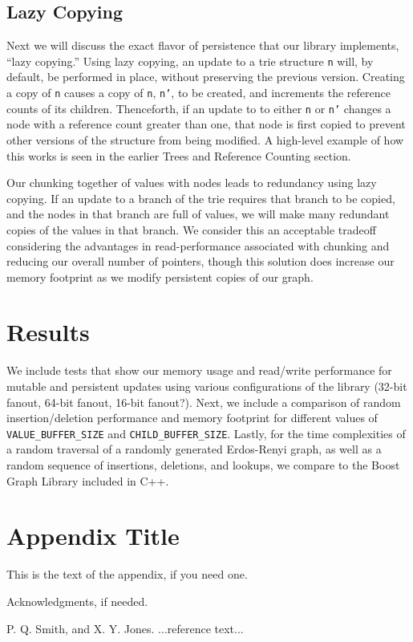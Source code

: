 \documentclass[preprint]{sigplanconf}
\begin{document}
\subsection{Lazy Copying}
Next we will discuss the exact flavor of persistence that our library implements, ``lazy copying.''
Using lazy copying, an update to a trie structure \texttt{n} will, by default, be performed in place, without preserving the previous version. 
Creating a copy of \texttt{n} causes a copy of \texttt{n}, \texttt{n'}, to be created, and increments the reference counts of its children.
Thenceforth, if an update to to either \texttt{n} or \texttt{n'} changes a node with a reference count greater than one, that node is first copied to prevent other versions of the structure from being modified.
A high-level example of how this works is seen in the earlier Trees and Reference Counting section. \par
Our chunking together of values with nodes leads to redundancy using lazy copying.
If an update to a branch of the trie requires that branch to be copied, and the nodes in that branch are full of values, we will make many redundant copies of the values in that branch.
We consider this an acceptable tradeoff considering the advantages in read-performance associated with chunking and reducing our overall number of pointers, though this solution does increase our memory footprint as we modify persistent copies of our graph.
\section{Results}
We include tests that show our memory usage and read/write performance for mutable and persistent updates using various configurations of the library (32-bit fanout, 64-bit fanout, 16-bit fanout?).
Next, we include a comparison of random insertion/deletion performance and memory footprint for different values of \texttt{VALUE\_BUFFER\_SIZE} and \texttt{CHILD\_BUFFER\_SIZE}.
Lastly, for the time complexities of a random traversal of a randomly generated Erdos-Renyi graph, as well as a random sequence of insertions, deletions, and lookups, we compare to the Boost Graph Library included in C++.

\appendix
\section{Appendix Title}

This is the text of the appendix, if you need one.

\acks

Acknowledgments, if needed.





\begin{thebibliography}{}
\softraggedright

P. Q. Smith, and X. Y. Jones. ...reference text...

\end{thebibliography}
\end{document}
